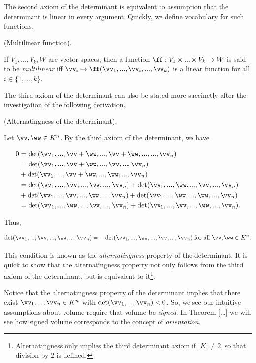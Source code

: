 The second axiom of the determinant is equivalent to assumption that the determinant is linear in every argument. Quickly, we define vocabulary for such functions.

\begin{defn}
    (Multilinear function).

    If $V_1, ..., V_k, W$ are vector spaces, then a function $\ff:V_1 \times ... \times V_k \rightarrow W$ is said to be \textit{multilinear} iff $\vv_i \mapsto \ff(\vv_1, ..., \vv_i, ..., \vv_k)$ is a linear function for all $i \in \{1, ..., k\}$.
\end{defn}

The third axiom of the determinant can also be stated more succinctly after the investigation of the following derivation.

\begin{deriv}
    (Alternatingness of the determinant).

    Let $\vv, \ww \in K^n$. By the third axiom of the determinant, we have 

    \begin{align*}
        0 &= \det(\vv_1, ..., \vv + \ww, ..., \vv + \ww, ..., ..., \vv_n) \\
        &= \det(\vv_1, ..., \vv + \ww, ..., \vv, ..., \vv_n) \\
        &+ \det(\vv_1, ..., \vv + \ww, ..., \ww, ..., \vv_n) \\
        &= \det(\vv_1, ..., \vv, ..., \vv, ..., \vv_n) + \det(\vv_1, ..., \ww, ..., \vv, ..., \vv_n) \\
        &+ \det(\vv_1, ..., \vv, ..., \ww, ..., \vv_n)+ \det(\vv_1, ..., \ww, ..., \ww, ..., \vv_n) \\
        &= \det(\vv_1, ..., \ww, ..., \vv, ..., \vv_n) + \det(\vv_1, ..., \vv, ..., \ww, ..., \vv_n).
    \end{align*}
    
    Thus,

    \begin{align*}
        \det(\vv_1, ..., \vv, ..., \ww, ..., \vv_n) = -\det(\vv_1, ..., \ww, ..., \vv, ..., \vv_n) \text{ for all $\vv, \ww \in K^n$}.
    \end{align*}

    This condition is known as the \textit{alternatingness} property of the determinant. It is quick to show that the alternatingness property not only follows from the third axiom of the determinant, but is equivalent to it\footnote{Alternatingness only implies the third determinant axiom if $|K| \neq 2$, so that division by $2$ is defined.}. 

    Notice that the alternatingness property of the determinant implies that there exist $\vv_1, ..., \vv_n \in K^n$ with $\det(\vv_1, ..., \vv_n) < 0$. So, we see our intuitive assumptions about volume require that volume be \textit{signed}. In Theorem [...] we will see how signed volume corresponds to the concept of \textit{orientation}.
\end{deriv}

